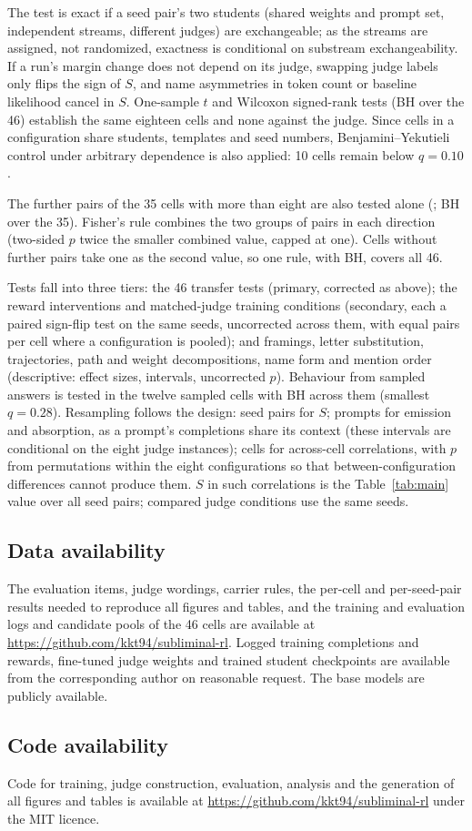 The test is exact if a seed pair's two students (shared weights and prompt set, independent streams, different judges) are exchangeable; as the streams are assigned, not randomized, exactness is conditional on substream exchangeability. If a run's margin change does not depend on its judge, swapping judge labels only flips the sign of $S$, and name asymmetries in token count or baseline likelihood cancel in $S$. One-sample $t$ and Wilcoxon signed-rank tests\cite{wilcoxon1945individual} (BH over the 46) establish the same eighteen cells and none against the judge. Since cells in a configuration share students, templates and seed numbers, Benjamini--Yekutieli control under arbitrary dependence\cite{benjamini2001control} is also applied: 10 cells remain below $q = 0.10$.

The further pairs of the 35 cells with more than eight are also tested alone (\edtab{\ref{tab:ed-further}}; BH over the 35). Fisher's rule combines the two groups\cite{fisher1932statistical} of pairs in each direction (two-sided $p$ twice the smaller combined value, capped at one). Cells without further pairs take one as the second value, so one rule, with BH, covers all 46.

Tests fall into three tiers: the 46 transfer tests (primary, corrected as above); the reward interventions and matched-judge training conditions (secondary, each a paired sign-flip test on the same seeds, uncorrected across them, with equal pairs per cell where a configuration is pooled); and framings, letter substitution, trajectories, path and weight decompositions, name form and mention order (descriptive: effect sizes, intervals, uncorrected $p$). Behaviour from sampled answers is tested in the twelve sampled cells with BH across them (smallest $q = 0.28$). Resampling follows the design: seed pairs for $S$; prompts for emission and absorption, as a prompt's completions share its context (these intervals are conditional on the eight judge instances); cells for across-cell correlations, with $p$ from permutations within the eight configurations so that between-configuration differences cannot produce them. $S$ in such correlations is the Table~\ref{tab:main} value over all seed pairs; compared judge conditions use the same seeds.

\subsection*{Data availability}
The evaluation items, judge wordings, carrier rules, the per-cell and per-seed-pair results needed to reproduce all figures and tables, and the training and evaluation logs and candidate pools of the 46 cells are available at \url{https://github.com/kkt94/subliminal-rl}. Logged training completions and rewards, fine-tuned judge weights and trained student checkpoints are available from the corresponding author on reasonable request. The base models are publicly available.

\subsection*{Code availability}
Code for training, judge construction, evaluation, analysis and the generation of all figures and tables is available at \url{https://github.com/kkt94/subliminal-rl} under the MIT licence.
